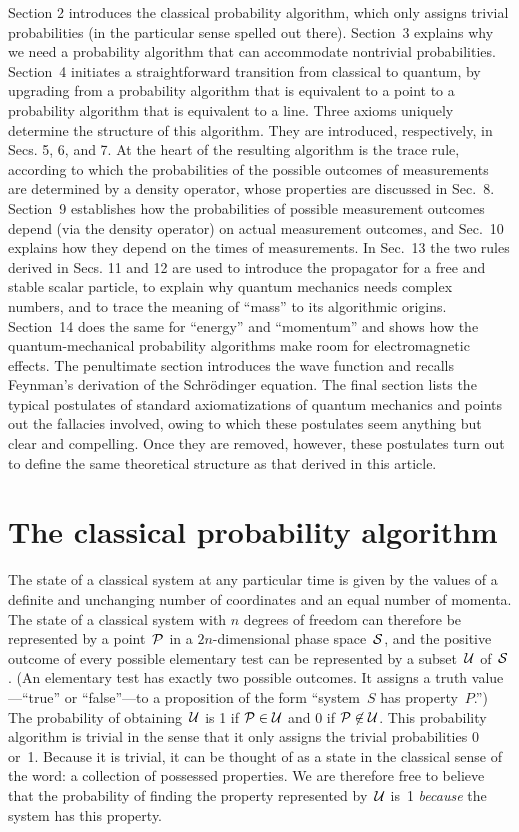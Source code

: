 \documentclass[12pt]{article}
\newcommand{\cP}{{\cal P}}
\newcommand{\cS}{{\cal S}}
\newcommand{\cU}{{\cal U}}
\begin{document}
Section 2 introduces the classical probability algorithm, which only assigns trivial probabilities (in the particular sense spelled out there). Section~3 explains why we need a probability algorithm that can accommodate nontrivial probabilities. Section~4 initiates a straightforward transition from classical to quantum, by upgrading from a probability algorithm that is equivalent to a point to a probability algorithm that is equivalent to a line. Three axioms uniquely determine the structure of this algorithm. They are introduced, respectively, in Secs. 5, 6, and 7. At the heart of the resulting algorithm is the trace rule, according to which the probabilities of the possible outcomes of measurements are determined by a density operator, whose properties are discussed in Sec.~8. Section~9 establishes how the probabilities of possible measurement outcomes depend (via the density operator) on actual measurement outcomes, and Sec.~10 explains how they depend on the times of measurements. In Sec.~13 the two rules derived in Secs. 11 and 12 are used to introduce the propagator for a free and stable scalar particle, to explain why quantum mechanics needs complex numbers, and to trace the meaning of ``mass'' to its algorithmic origins. Section~14 does the same for ``energy'' and ``momentum'' and shows how the quantum-mechanical probability algorithms make room for electromagnetic effects. The penultimate section introduces the wave function and recalls Feynman's derivation of the Schr\"odinger equation. The final section lists the typical postulates of standard axiomatizations of quantum mechanics and points out the fallacies involved, owing to which these postulates seem anything but clear and compelling. Once they are removed, however, these postulates turn out to define the same theoretical structure as that derived in this article.

\section{The classical probability algorithm}
\label{SecClPA}The state of a classical system at any particular time is given by the values of a definite and unchanging number of coordinates and an equal number of momenta. The state of a classical system with $n$ degrees of freedom can therefore be represented by a point~$\cP$ in a $2n$-dimensional phase space~$\cS$, and the positive outcome of every possible elementary test can be represented by a subset~$\cU$ of~$\cS$. (An elementary test has exactly two possible outcomes. It assigns a truth value---``true'' or ``false''---to a proposition of the form ``system~$S$ has property~$P$.'') The probability of obtaining~$\cU$ is 1 if $\cP\in\cU$ and 0 if $\cP\not\in\cU$. This probability algorithm is trivial in the sense that it only assigns the trivial probabilities 0 or~1. Because it is trivial, it can be thought of as a state in the classical sense of the word: a collection of possessed properties. We are therefore free to believe that the probability of finding the property represented by~$\cU$ is~1 \textit{because} the system has this property.
\end{document}
